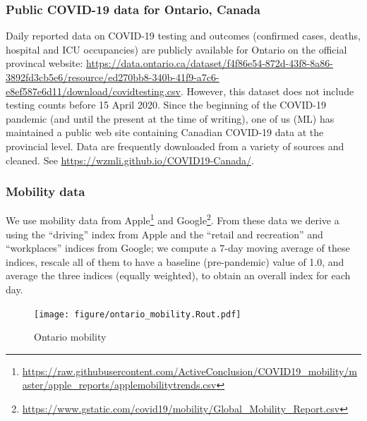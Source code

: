 \documentclass[12pt]{article}\usepackage[]{graphicx}\usepackage[]{color}
\begin{document}
\subsubsection*{Public COVID-19 data for Ontario, Canada}

Daily reported data on COVID-19 testing and outcomes (confirmed cases, deaths, hospital and ICU occupancies) are publicly available for Ontario on the official provincal website:
\url{https://data.ontario.ca/dataset/f4f86e54-872d-43f8-8a86-3892fd3cb5e6/resource/ed270bb8-340b-41f9-a7c6-e8ef587e6d11/download/covidtesting.csv}.
However, this dataset does not include testing counts before 15 April 2020.  Since the beginning of the COVID-19 pandemic (and until the present at the time of writing), one of us (ML) has maintained a public web site containing Canadian COVID-19 data at the provincial level.  Data are frequently downloaded from a variety of sources and cleaned.  See \url{https://wzmli.github.io/COVID19-Canada/}.

\hypertarget{Mobility data}{}
\subsubsection*{Mobility data}

We use mobility data from Apple\footnote{\url{https://raw.githubusercontent.com/ActiveConclusion/COVID19_mobility/master/apple_reports/applemobilitytrends.csv}} and Google\footnote{\url{https://www.gstatic.com/covid19/mobility/Global_Mobility_Report.csv}}.  From these data we derive a  using the ``driving'' index from Apple and the ``retail and recreation'' and ``workplaces'' indices from Google; we compute a 7-day moving average of these indices, rescale all of them to have a baseline (pre-pandemic) value of 1.0, and average the three indices (equally weighted), to obtain an overall index for each day.


\begin{figure}[ht!]
\texttt{[image: figure/ontario\_mobility.Rout.pdf]}

\caption{Ontario mobility 
}
\label{fig:Ont_mobility}
\end{figure}
\end{document}
